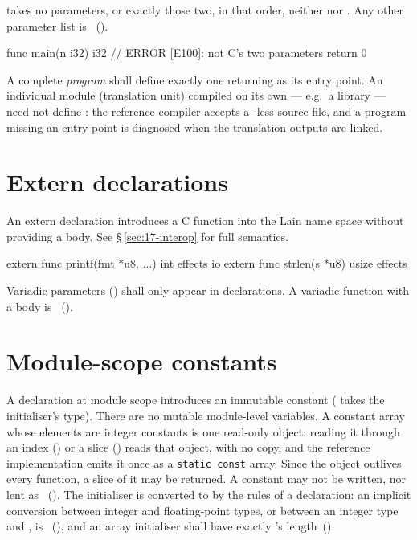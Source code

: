 \begin{constraint}
   takes no parameters, or exactly those two, in that order, neither 
  nor .  Any other parameter list is \illformed{}~().
\end{constraint}

\begin{laincode}
func main(n i32) i32 {      // ERROR [E100]: not C's two parameters
    return 0
}
\end{laincode}

\begin{constraint}
  A complete \emph{program} shall define exactly one  returning  as
  its entry point.  An individual module (translation unit) compiled on its own
  --- e.g.\ a library --- need not define : the reference compiler
  accepts a -less source file, and a program missing an entry point
  is diagnosed when the translation outputs are linked.
\end{constraint}

\section{Extern declarations}
\label{sec:decl.extern}

\pnum
An extern declaration introduces a C function into the Lain name space
without providing a body.  See \S\,\ref{sec:17-interop} for full semantics.

\begin{laincode}
extern func printf(fmt *u8, ...) int effects io
extern func strlen(s *u8) usize effects
\end{laincode}

\begin{constraint}
  Variadic parameters () shall only appear in 
  declarations.  A variadic function with a body is \illformed{}~().
\end{constraint}

\section{Module-scope constants}
\label{sec:decl.module-const}

\pnum
A declaration  at module scope introduces an immutable constant
( takes the initialiser's type). There are no mutable module-level
variables. A constant array whose elements are integer constants is one read-only object:
reading it through an index () or a slice () reads that
object, with no copy, and the reference implementation emits it once as a \texttt{static const}
array. Since the object outlives every function, a slice of it may be returned. A constant may not be
written, nor lent as ~(). The initialiser is converted to  by the rules of a declaration: an implicit
conversion between integer and floating-point types, or between an integer type and
, is \illformed{}~(), and an array initialiser shall have exactly
's length~().


